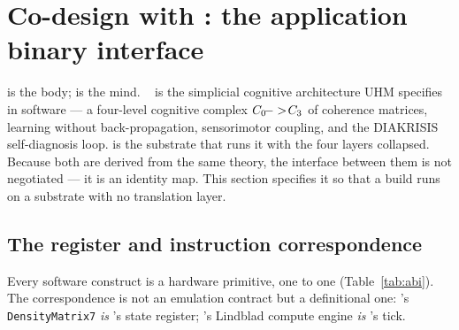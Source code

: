 \section{Co-design with \SYNARC{}: the application binary interface}
\label{sec:abi}

\TALOS{} is the body; \SYNARC{} is the mind. \SYNARC{}~\cite{synarc2026} is the
simplicial cognitive architecture UHM specifies in software --- a four-level cognitive
complex $C_0\!->\!C_3$ of coherence matrices, learning without
back-propagation, sensorimotor coupling, and the DIAKRISIS self-diagnosis
loop. \TALOS{} is the substrate that runs it with the four layers collapsed.
Because both are derived from the same theory, the interface between them is
not negotiated --- it is an identity map. This section specifies it so that a
\SYNARC{} build runs on a \TALOS{} substrate with no translation layer.

\subsection{The register and instruction correspondence}

Every \SYNARC{} software construct is a \TALOS{} hardware primitive, one to
one (Table~\ref{tab:abi}). The correspondence is not an emulation contract
but a definitional one: \SYNARC{}'s \texttt{DensityMatrix7} \emph{is}
\TALOS{}'s state register; \SYNARC{}'s Lindblad compute engine \emph{is}
\TALOS{}'s tick.

